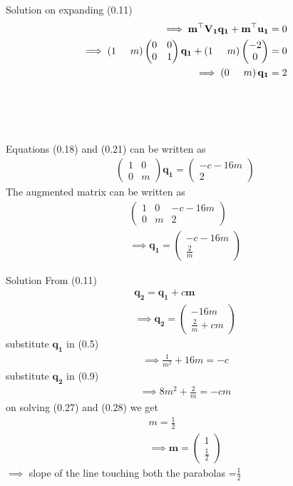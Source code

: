 \documentclass{beamer}
\numberwithin{equation}{section}
\providecommand{\brak}[1]{\ensuremath{\left(#1\right)}}
\theoremstyle{remark}
\newcommand{\myvec}[1]{\ensuremath{\begin{pmatrix}#1\end{pmatrix}}}
\let\vec\mathbf
\begin{document}
\begin{frame}{Solution}
on expanding (0.11)
\begin{align}
    \implies \vec{m}^\top\vec{V_1}\vec{q_1}+  \vec{m}^\top\vec{u_1}=0\\
    \implies  \brak{1 \hspace{0.5cm} m}\begin{pmatrix}
        0 & 0\\
        0 & 1
    \end{pmatrix}\vec{q_1}+  \brak{1 \hspace{0.5cm} m} \myvec{-2\\0}=0\\
    \implies \brak{0 \hspace{0.5cm} m}\vec{q_1}=2
\end{align}\\ \\ \\ \\ 
Equations (0.18) and (0.21) can be written  as
\begin{align}
    \begin{pmatrix}
        1 & 0\\
        0 & m
    \end{pmatrix} \vec{q_1}=\myvec{-c-16m\\2}
\end{align}
The augmented matrix can be written as
\begin{align}
     \left(\begin{array}{cc|c}
        1 & 0 & -c-16m \\
        0 & m & 2 
\end{array}\right)\\
\implies \vec{q_1}=\myvec{-c-16m\\ \frac{2}{m}}
\end{align}
\end{frame}

\begin{frame}{Solution}
From (0.11)
\begin{align}
\vec{q_2}=\vec{q_1} + c\vec{m}\\
   \implies \vec{q_2}=\myvec{-16m\\ \frac{2}{m}+cm}
\end{align}
substitute $\vec{q_1}$ in (0.5)
\begin{align}
    \implies \frac{1}{{m}^2} + 16m=-c
\end{align}
substitute $\vec{q_2}$ in (0.9)
\begin{align}
   \implies  8m^2 + \frac{2}{m}=-cm
\end{align}
on solving (0.27) and (0.28) we get 
\begin{align}
    m=\frac{1}{2}\\
    \implies \vec{m}=\myvec{1\\ \frac{1}{2}}
\end{align}
$\implies$ slope of the line touching both the parabolas =$\frac{1}{2}$
\end{frame}
\end{document}

